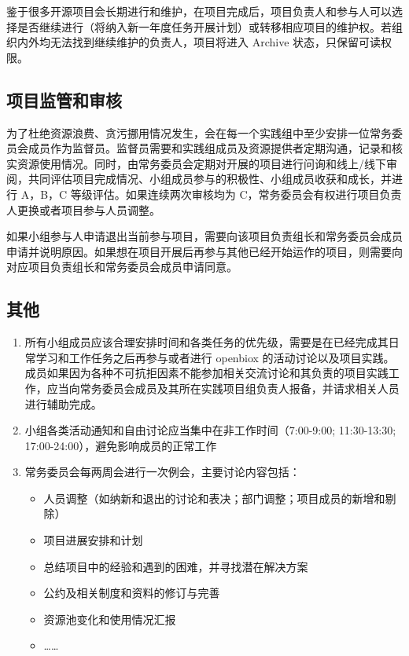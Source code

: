 \documentclass[]{article}
\providecommand{\tightlist}{%
  \setlength{\itemsep}{0pt}\setlength{\parskip}{0pt}}
\begin{document}
鉴于很多开源项目会长期进行和维护，在项目完成后，项目负责人和参与人可以选择是否继续进行（将纳入新一年度任务开展计划）或转移相应项目的维护权。若组织内外均无法找到继续维护的负责人，项目将进入
Archive 状态，只保留可读权限。

\subsection{项目监管和审核}

为了杜绝资源浪费、贪污挪用情况发生，会在每一个实践组中至少安排一位常务委员会成员作为监督员。监督员需要和实践组成员及资源提供者定期沟通，记录和核实资源使用情况。同时，由常务委员会定期对开展的项目进行问询和线上/线下审阅，共同评估项目完成情况、小组成员参与的积极性、小组成员收获和成长，并进行
A，B，C 等级评估。如果连续两次审核均为
C，常务委员会有权进行项目负责人更换或者项目参与人员调整。

如果小组参与人申请退出当前参与项目，需要向该项目负责组长和常务委员会成员申请并说明原因。如果想在项目开展后再参与其他已经开始运作的项目，则需要向对应项目负责组长和常务委员会成员申请同意。

\subsection{其他}

\begin{enumerate}
\def\labelenumi{\arabic{enumi}.}
\item
  所有小组成员应该合理安排时间和各类任务的优先级，需要是在已经完成其日常学习和工作任务之后再参与或者进行
  openbiox
  的活动讨论以及项目实践。成员如果因为各种不可抗拒因素不能参加相关交流讨论和其负责的项目实践工作，应当向常务委员会成员及其所在实践项目组负责人报备，并请求相关人员进行辅助完成。
\item
  小组各类活动通知和自由讨论应当集中在非工作时间（7:00-9:00;
  11:30-13:30; 17:00-24:00），避免影响成员的正常工作
\item
  常务委员会每两周会进行一次例会，主要讨论内容包括：

  \begin{itemize}
  \tightlist
  \item
    人员调整（如纳新和退出的讨论和表决；部门调整；项目成员的新增和剔除）
  \item
    项目进展安排和计划
  \item
    总结项目中的经验和遇到的困难，并寻找潜在解决方案
  \item
    公约及相关制度和资料的修订与完善
  \item
    资源池变化和使用情况汇报
  \item
    \ldots{}\ldots{}
  \end{itemize}
\end{enumerate}
\end{document}
